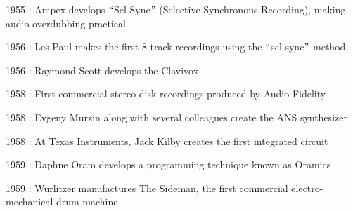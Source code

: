 \documentclass[12pt]{report}
\begin{document}
\begin{adjustwidth}{0.5in}{0.0in}
1955 : Ampex develops $``$Sel-Sync$"$  (Selective Synchronous Recording), making audio overdubbing practical\par

\end{adjustwidth}

\begin{adjustwidth}{0.5in}{0.0in}
1956 : Les Paul makes the first 8-track recordings using the $``$sel-sync$"$  method\par

\end{adjustwidth}

\begin{adjustwidth}{0.5in}{0.0in}
1956 : Raymond Scott develops the Clavivox\par

\end{adjustwidth}

\begin{adjustwidth}{0.5in}{0.0in}
1958 : First commercial stereo disk recordings produced by Audio Fidelity\par

\end{adjustwidth}

\begin{adjustwidth}{0.5in}{0.0in}
1958 : Evgeny Murzin along with several colleagues create the ANS synthesizer\par

\end{adjustwidth}

\begin{adjustwidth}{0.5in}{0.0in}
1958 : At Texas Instruments, Jack Kilby creates the first integrated circuit\par

\end{adjustwidth}

\begin{adjustwidth}{0.5in}{0.0in}
1959 : Daphne Oram develops a programming technique known as Oramics\par

\end{adjustwidth}

\begin{adjustwidth}{0.5in}{0.0in}
1959 : Wurlitzer manufactures The Sideman, the first commercial electro-mechanical drum machine\par

\end{adjustwidth}
\end{document}
